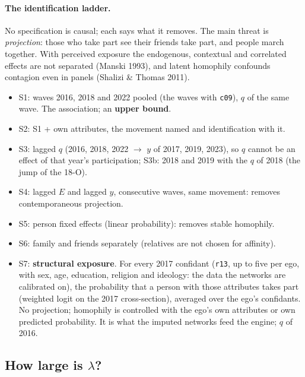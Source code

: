 \documentclass[11pt,a4paper]{article}
\newcommand{\code}[1]{\texttt{#1}}
\begin{document}
\paragraph{The identification ladder.} No specification is causal; each says what it removes. The main
threat is \emph{projection}: those who take part see their friends take part, and people march together.
With perceived exposure the endogenous, contextual and correlated effects are not separated (Manski 1993),
and latent homophily confounds contagion even in panels (Shalizi \& Thomas 2011).
\begin{itemize}
  \item S1: waves 2016, 2018 and 2022 pooled (the waves with \code{c09}), $q$ of the same wave. The
    association; an \textbf{upper bound}.
  \item S2: S1 + own attributes, the movement named and identification with it.
  \item S3: lagged $q$ (2016, 2018, 2022 $\to$ $y$ of 2017, 2019, 2023), so $q$ cannot be an effect of that
    year's participation; S3b: 2018 and 2019 with the $q$ of 2018 (the jump of the 18-O).
  \item S4: lagged $E$ and lagged $y$, consecutive waves, same movement: removes contemporaneous projection.
  \item S5: person fixed effects (linear probability): removes stable homophily.
  \item S6: family and friends separately (relatives are not chosen for affinity).
  \item S7: \textbf{structural exposure}. For every 2017 confidant (\code{r13}, up to five per ego, with
    sex, age, education, religion and ideology: the data the networks are calibrated on), the probability
    that a person with those attributes takes part (weighted logit on the 2017 cross-section), averaged over
    the ego's confidants. No projection; homophily is controlled with the ego's own attributes or own
    predicted probability. It is what the imputed networks feed the engine; $q$ of 2016.
\end{itemize}

\subsection{How large is \texorpdfstring{$\lambda$}{lambda}?}
\label{sec:rule-lambda}
\end{document}
